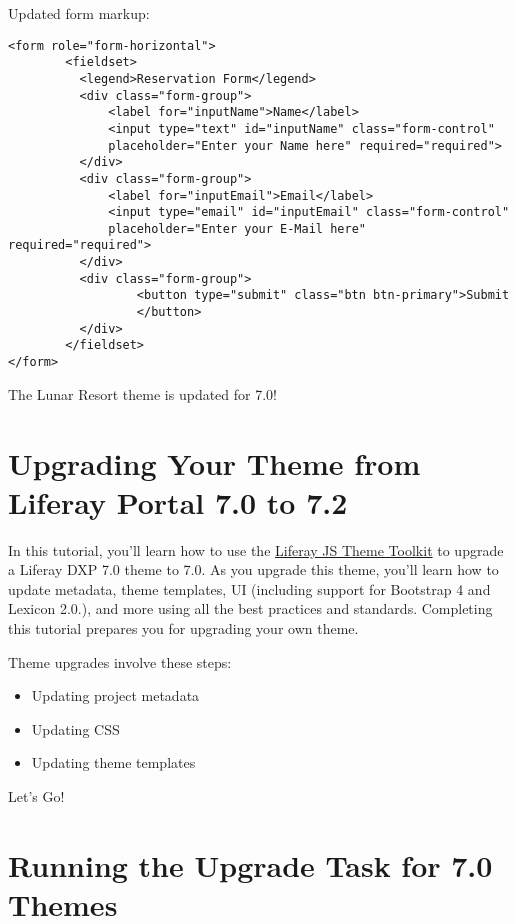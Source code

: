 Updated form markup:

\begin{verbatim}
<form role="form-horizontal">
        <fieldset>
          <legend>Reservation Form</legend>
          <div class="form-group">
              <label for="inputName">Name</label>
              <input type="text" id="inputName" class="form-control"
              placeholder="Enter your Name here" required="required">
          </div>
          <div class="form-group">
              <label for="inputEmail">Email</label>
              <input type="email" id="inputEmail" class="form-control"
              placeholder="Enter your E-Mail here" required="required">
          </div>
          <div class="form-group">
                  <button type="submit" class="btn btn-primary">Submit
                  </button>
          </div>
        </fieldset>
</form>
\end{verbatim}

The Lunar Resort theme is updated for 7.0!

\chapter{Upgrading Your Theme from Liferay Portal 7.0 to
7.2}\label{upgrading-your-theme-from-liferay-portal-7.0-to-7.2}

In this tutorial, you'll learn how to use the
\href{https://github.com/liferay/liferay-js-themes-toolkit/tree/master/packages}{Liferay
JS Theme Toolkit} to upgrade a Liferay DXP 7.0 theme to 7.0. As you
upgrade this theme, you'll learn how to update metadata, theme
templates, UI (including support for Bootstrap 4 and Lexicon 2.0.), and
more using all the best practices and standards. Completing this
tutorial prepares you for upgrading your own theme.

Theme upgrades involve these steps:

\begin{itemize}
\tightlist
\item
  Updating project metadata
\item
  Updating CSS
\item
  Updating theme templates
\end{itemize}

Let's Go!{}

\chapter{Running the Upgrade Task for 7.0
Themes}\label{running-the-upgrade-task-for-7.0-themes}

